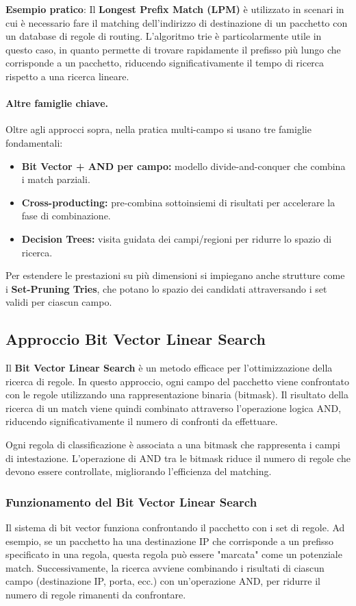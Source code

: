 \textbf{Esempio pratico}:
Il \textbf{Longest Prefix Match (LPM)} è utilizzato in scenari in cui è necessario fare il matching dell'indirizzo di destinazione di un pacchetto con un database di regole di routing. L'algoritmo trie è particolarmente utile in questo caso, in quanto permette di trovare rapidamente il prefisso più lungo che corrisponde a un pacchetto, riducendo significativamente il tempo di ricerca rispetto a una ricerca lineare.

\paragraph{Altre famiglie chiave.}
Oltre agli approcci sopra, nella pratica multi-campo si usano tre famiglie fondamentali:
\begin{itemize}
  \item \textbf{Bit Vector + AND per campo:} modello divide-and-conquer che combina i match parziali.
  \item \textbf{Cross-producting:} pre-combina sottoinsiemi di risultati per accelerare la fase di combinazione.
  \item \textbf{Decision Trees:} visita guidata dei campi/regioni per ridurre lo spazio di ricerca.
\end{itemize}
Per estendere le prestazioni su più dimensioni si impiegano anche strutture come i \textbf{Set-Pruning Tries}, che potano lo spazio dei candidati attraversando i set validi per ciascun campo.

\subsection{Approccio Bit Vector Linear Search}

Il \textbf{Bit Vector Linear Search} è un metodo efficace per l'ottimizzazione della ricerca di regole. In questo approccio, ogni campo del pacchetto viene confrontato con le regole utilizzando una rappresentazione binaria (bitmask). Il risultato della ricerca di un match viene quindi combinato attraverso l'operazione logica AND, riducendo significativamente il numero di confronti da effettuare.

Ogni regola di classificazione è associata a una bitmask che rappresenta i campi di intestazione. L'operazione di AND tra le bitmask riduce il numero di regole che devono essere controllate, migliorando l'efficienza del matching.

\subsubsection{Funzionamento del Bit Vector Linear Search}
Il sistema di bit vector funziona confrontando il pacchetto con i set di regole. Ad esempio, se un pacchetto ha una destinazione IP che corrisponde a un prefisso specificato in una regola, questa regola può essere "marcata" come un potenziale match. Successivamente, la ricerca avviene combinando i risultati di ciascun campo (destinazione IP, porta, ecc.) con un'operazione AND, per ridurre il numero di regole rimanenti da confrontare.


